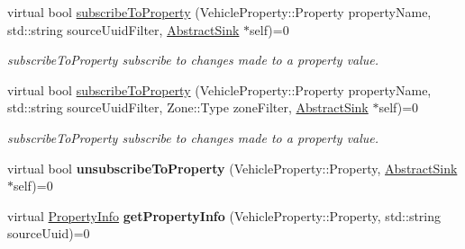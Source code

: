 \begin{DoxyCompactItemize}
\item 
virtual bool \hyperlink{classAbstractRoutingEngine_a89b4fee7c881662660c530fbcf786648}{subscribe\-To\-Property} (Vehicle\-Property\-::\-Property property\-Name, std\-::string source\-Uuid\-Filter, \hyperlink{classAbstractSink}{Abstract\-Sink} $\ast$self)=0
\begin{DoxyCompactList}\small\item\em subscribe\-To\-Property subscribe to changes made to a property value. \end{DoxyCompactList}\item 
virtual bool \hyperlink{classAbstractRoutingEngine_ae11da6ec0b7438d570c2eb72318c43ee}{subscribe\-To\-Property} (Vehicle\-Property\-::\-Property property\-Name, std\-::string source\-Uuid\-Filter, Zone\-::\-Type zone\-Filter, \hyperlink{classAbstractSink}{Abstract\-Sink} $\ast$self)=0
\begin{DoxyCompactList}\small\item\em subscribe\-To\-Property subscribe to changes made to a property value. \end{DoxyCompactList}\item 
\hypertarget{classAbstractRoutingEngine_afe919effa9d06a8691c34f18774da873}{virtual bool {\bfseries unsubscribe\-To\-Property} (Vehicle\-Property\-::\-Property, \hyperlink{classAbstractSink}{Abstract\-Sink} $\ast$self)=0}\label{classAbstractRoutingEngine_afe919effa9d06a8691c34f18774da873}

\item 
\hypertarget{classAbstractRoutingEngine_a63a98e81d8ebff758f0b7df3325388ae}{virtual \hyperlink{classPropertyInfo}{Property\-Info} {\bfseries get\-Property\-Info} (Vehicle\-Property\-::\-Property, std\-::string source\-Uuid)=0}\label{classAbstractRoutingEngine_a63a98e81d8ebff758f0b7df3325388ae}

\end{DoxyCompactItemize}


